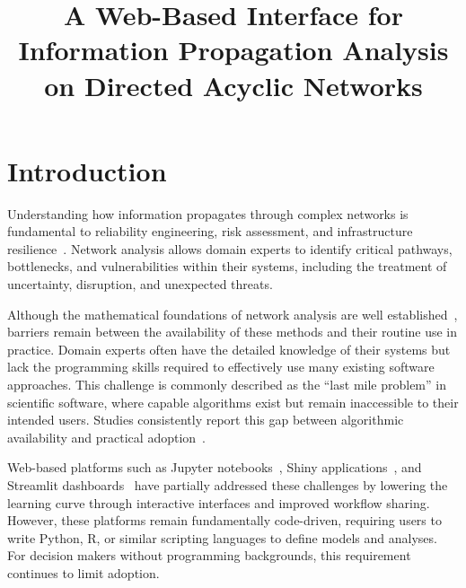 \documentclass[conference]{IEEEtran}
\begin{document}
\title{A Web-Based Interface for Information Propagation Analysis on Directed Acyclic Networks}

\author{
}

\maketitle

\begin{abstract}
\end{abstract}

\section{Introduction}
Understanding how information propagates through complex networks is fundamental to reliability engineering, risk assessment, and infrastructure resilience~\cite{ferson2015}. Network analysis allows domain experts to identify critical pathways, bottlenecks, and vulnerabilities within their systems, including the treatment of uncertainty, disruption, and unexpected threats.

Although the mathematical foundations of network analysis are well established~\cite{pearl1988probabilistic, koller2009probabilistic, ferson2015}, barriers remain between the availability of these methods and their routine use in practice. Domain experts often have the detailed knowledge of their systems but lack the programming skills required to effectively use many existing software approaches. This challenge is commonly described as the ``last mile problem'' in scientific software, where capable algorithms exist but remain inaccessible to their intended users. Studies consistently report this gap between algorithmic availability and practical adoption~\cite{hannay2009scientists, prabhu2011survey}.

Web-based platforms such as Jupyter notebooks~\cite{kluyver2016jupyter}, Shiny applications~\cite{chang2015shiny}, and Streamlit dashboards~\cite{streamlit2019} have partially addressed these challenges by lowering the learning curve through interactive interfaces and improved workflow sharing. However, these platforms remain fundamentally code-driven, requiring users to write Python, R, or similar scripting languages to define models and analyses. For decision makers without programming backgrounds, this requirement continues to limit adoption.
\end{document}
